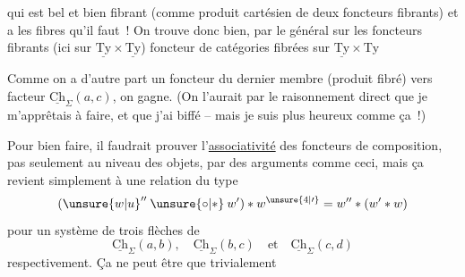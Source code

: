 qui est bel et bien fibrant (comme produit cartésien de deux foncteurs fibrants) et a les fibres qu'il faut~! On trouve donc bien, par le  général sur les foncteurs fibrants (ici sur $\underline{\mathrm{Ty}}\times\underline{\mathrm{Ty}}$)  foncteur de catégories fibrées sur $\underline{\mathrm{Ty}}\times\mathrm{Ty}$

Comme on a d'autre part un  foncteur du dernier membre (produit fibré) vers  facteur $\underline{\mathrm{Ch}}_\Sigma(a,c)$, on gagne. (On l'aurait  par le raisonnement direct que je m'apprêtais à faire, et que j'ai biffé -- mais je suis plus heureux comme ça~!)

Pour bien faire, il faudrait prouver l'\uline{associativité} des foncteurs de composition, pas seulement au niveau des objets, par des arguments comme ceci, mais ça revient simplement à une relation du type
\[
(\unsure{w|u}''\mathbin{\unsure{\circ|*}}w')*w^{\unsure{4|\prime}}=w''*(w'*w)
\]
pour  un système de trois flèches de
\[
\underline{\mathrm{Ch}}_\Sigma(a,b),\quad \underline{\mathrm{Ch}}_\Sigma(b,c)\quad\text{et}\quad\underline{\mathrm{Ch}}_\Sigma(c,d)
\]
respectivement. Ça ne peut être que trivialement
